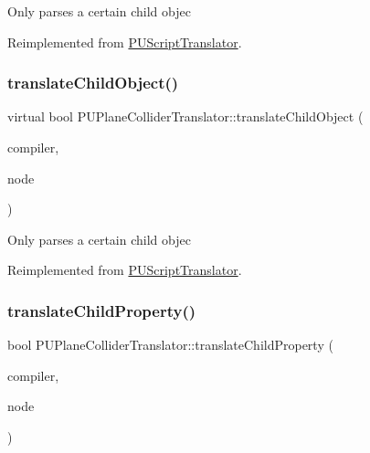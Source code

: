 Only parses a certain child objec 

Reimplemented from \hyperlink{classPUScriptTranslator_ab587d01348ae3e678cb700c719b2b113}{P\+U\+Script\+Translator}.

\mbox{\label{classPUPlaneColliderTranslator_a7ecd66bfbce9aed23821bead84847c48}} 
\subsubsection{\texorpdfstring{translate\+Child\+Object()}{translateChildObject()}\hspace{0.1cm}{\footnotesize\ttfamily [2/2]}}
{\footnotesize\ttfamily virtual bool P\+U\+Plane\+Collider\+Translator\+::translate\+Child\+Object (\begin{DoxyParamCaption}\item[{\hyperlink{classPUScriptCompiler}{P\+U\+Script\+Compiler} $\ast$}]{compiler,  }\item[{\hyperlink{classPUAbstractNode}{P\+U\+Abstract\+Node} $\ast$}]{node }\end{DoxyParamCaption})\hspace{0.3cm}{\ttfamily [virtual]}}

Only parses a certain child objec 

Reimplemented from \hyperlink{classPUScriptTranslator_ab587d01348ae3e678cb700c719b2b113}{P\+U\+Script\+Translator}.

\mbox{\label{classPUPlaneColliderTranslator_a270c710deb9d9d2a296077f745dfc369}} 
\subsubsection{\texorpdfstring{translate\+Child\+Property()}{translateChildProperty()}\hspace{0.1cm}{\footnotesize\ttfamily [1/2]}}
{\footnotesize\ttfamily bool P\+U\+Plane\+Collider\+Translator\+::translate\+Child\+Property (\begin{DoxyParamCaption}\item[{\hyperlink{classPUScriptCompiler}{P\+U\+Script\+Compiler} $\ast$}]{compiler,  }\item[{\hyperlink{classPUAbstractNode}{P\+U\+Abstract\+Node} $\ast$}]{node }\end{DoxyParamCaption})\hspace{0.3cm}{\ttfamily [virtual]}}

